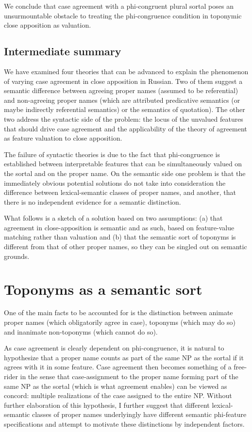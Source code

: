 \documentclass[output=paper,colorlinks,citecolor=brown]{langscibook}
\begin{document}
We conclude that case agreement with a phi-congruent plural sortal poses an unsurmountable obstacle to treating the phi-congruence condition in toponymic close apposition as valuation.

\subsection{Intermediate summary}\label{mat:sec:intermediate-summary2}

We have examined four theories that can be advanced to explain the phenomenon of varying case agreement in close apposition in Russian. Two of them suggest a semantic difference between agreeing proper names (assumed to be referential) and non-agreeing proper names (which are attributed predicative semantics (or maybe indirectly referential semantics) or the semantics of quotation). The other two address the syntactic side of the problem: the locus of the unvalued features that should drive case agreement and the applicability of the theory of agreement as feature valuation to close apposition.

The failure of syntactic theories is due to the fact that phi-congruence is established between interpretable features that can be simultaneously valued on the sortal and on the proper name. On the semantic side one problem is that the immediately obvious potential solutions do not take into consideration the difference between lexical-semantic classes of proper names, and another, that there is no independent evidence for a semantic distinction.

What follows is a sketch of a solution based on two assumptions: (a) that agreement in close-apposition is semantic and as such, based on feature-value matching rather than valuation and (b) that the semantic sort of toponyms is different from that of other proper names, so they can be singled out on semantic grounds. 

\section{Toponyms as a semantic sort}\label{mat:sec:toponyms-as-semantic-sort}

One of the main facts to be accounted for is the distinction between animate proper names (which obligatorily agree in case), toponyms (which may do so) and inanimate non-toponyms (which cannot do so).

As case agreement is clearly dependent on phi-congruence, it is natural to hypothesize that a proper name counts as part of the same NP as the sortal if it agrees with it in some feature. Case agreement then becomes something of a free-rider in the sense that case-assignment to the proper name forming part of the same NP as the sortal (which is what agreement enables) can be viewed as concord: multiple realizations of the case assigned to the entire NP. Without further elaboration of this hypothesis, I further suggest that different lexical-semantic classes of proper names underlyingly have different semantic phi-feature specifications and attempt to motivate these distinctions by independent factors.
\end{document}

